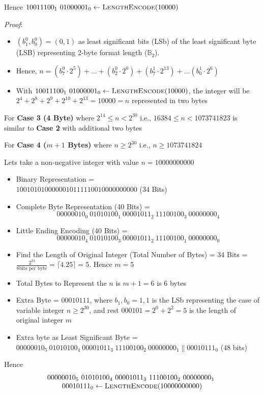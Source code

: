 \documentclass[../alan-handbook.tex]{subfiles}
\begin{document}
Hence $10011100_1 \ 01000001_0 \gets \Call{LengthEncode}{10000}$

\textit{Proof}:
\begin{itemize}
\item $(b_1^0,b_0^0)=(0,1)$ as least significant bits (LSb) of the least significant byte (LSB) representing 2-byte format length ($\mathbb{B}_2$).
\item Hence, $n=(b_7^0 \cdot 2^5)+ \ldots + (b_2^0 \cdot 2^0) + (b_7^1 \cdot 2^{13}) + \ldots (b_0^1 \cdot 2^6)$
\item With $10011100_1 \ 01000001_0 \gets \Call{LengthEncode}{10000}$, the integer will be $2^4+2^8+2^9+2^{10}+2^{13}=10000=n$ represented in two bytes
\end{itemize} 

For \textbf{Case 3 (4 Byte)} where $2^{14} \leq n < 2^{30}$ i.e., $16384 \leq n < 1073741823$ is similar to \textbf{Case 2} with additional two bytes


For \textbf{Case 4 ($m+1$ Bytes)} where $n \geq 2^{30}$ i.e., $n \geq 1073741824$

Lets take a non-negative integer with value $n=10000000000$

\begin{itemize}
    \item Binary Representation = \\
    $1001010100000010111110010000000000$ (34 Bits)
    \item Complete Byte Representation (40 Bits) = 
    $$00000010_0 \ 01010100_1 \ 00001011_2 \ 11100100_3 \ 00000000_4$$ 
    \item Little Ending Encoding (40 Bits) = 
    $$00000010_4 \ 01010100_3 \ 00001011_2 \ 11100100_1 \ 00000000_0$$ 
    \item Find the Length of Original Integer (Total Number of Bytes) = 34 Bits = $\frac{2^{34}}{8 \text{bits per byte}} =  \lceil 4.25 \rceil = 5 $. Hence $m=5$
    \item Total Bytes to Represent the $n$  is $m+1=6$ is 6 bytes
    \item Extra Byte = $00010111$, where $b_1,b_0=1,1$ is the LSb representing the case of variable integer $n \geq 2^{30}$, and rest $000101 = 2^0+2^2=5$ is the length of original integer $m$
    \item Extra byte as Least Significant Byte = $00000010_5 \ 01010100_4 \ 00001011_3 \ 11100100_2 \ 00000000_1 \parallel 00010111_0$  (48 bits)
\end{itemize}

Hence 
$$
\begin{matrix}
    00000010_5 \ 01010100_4 \ 00001011_3 \ 11100100_2 \ 00000000_1 \ \\
    00010111_0 \gets \Call{LengthEncode}{10000000000}
\end{matrix}
$$
\end{document}
